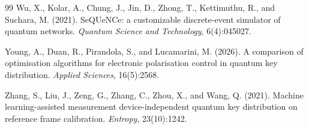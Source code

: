 \documentclass[12pt]{article}
\begin{document}
\begin{thebibliography}{99}
 Wu, X., Kolar, A., Chung, J., Jin, D., Zhong, T., Kettimuthu, R., and
Suchara, M. (2021). SeQUeNCe: a customizable discrete-event simulator of
quantum networks. \emph{Quantum Science and Technology}, 6(4):045027.

 Young, A., Duan, R., Pirandola, S., and Lucamarini, M. (2026). A
comparison of optimisation algorithms for electronic polarisation control in
quantum key distribution. \emph{Applied Sciences}, 16(5):2568.

 Zhang, S., Liu, J., Zeng, G., Zhang, C., Zhou, X., and Wang, Q.
(2021). Machine learning-assisted measurement device-independent quantum key
distribution on reference frame calibration. \emph{Entropy}, 23(10):1242.

\end{thebibliography}
\end{document}
